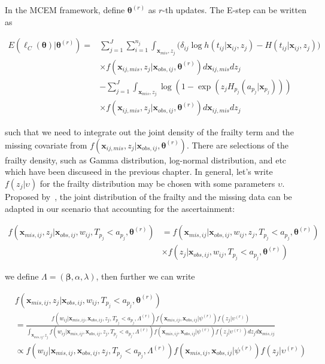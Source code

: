 \documentclass[preprint,12pt]{elsarticle}
\begin{document}
In the MCEM framework, define $\boldsymbol{\theta}^{(r)}$ as $r$-th updates. 
The E-step can be written as 

\begin{align} 
    E(\ell_C(\boldsymbol{\theta})|\boldsymbol{\theta}^{(r)})=&\sum_{j=1}^J\sum_{i=1}^{n_j}\int_{\mathbf{x}_{mis}, z_j}\Big (\delta_{ij}\log h(t_{ij}|\mathbf{x}_{ij}, z_j) - H(t_{ij}|\mathbf{x}_{ij}, z_j)\Big )\\
    &\times f(\mathbf{x}_{ij,mis}, z_j|\mathbf{x}_{obs,ij}, \boldsymbol{\theta}^{(r)})d\mathbf{x}_{ij,mis}dz_j\\
    &-\sum_{j=1}^J \int_{\mathbf{x}_{mis}, z_j} \log(1- \exp(z_j H_{p_j}(a_{p_j}|\mathbf{x}_{p_j})))\\
    &\times f(\mathbf{x}_{ij,mis}, z_j|\mathbf{x}_{obs,ij}, \boldsymbol{\theta}^{(r)})d\mathbf{x}_{ij,mis}dz_j
\end{align}

such that we need to integrate out the joint density of the frailty term and the missing covariate from $f(\mathbf{x}_{ij,mis}, z_j|\mathbf{x}_{obs,ij}, \boldsymbol{\theta}^{(r)})$. 
There are selections of the frailty density, such as Gamma distribution, log-normal distribution, and etc which have been discuseed in the previous chapter.  
In general, let's write $f(z_j|\upsilon)$ for the frailty distribution may be chosen with some parameters $\upsilon$. 
Proposed by~\citet{herring2002frailty}, the joint distribution of the frailty and the missing data can be adapted in our scenario that accounting for the ascertainment:

\begin{align} 
    f(\mathbf{x}_{mis,ij}, z_j|\mathbf{x}_{obs,ij}, w_{ij}, T_{p_j}<a_{p_j}, \boldsymbol{\theta}^{(r)})&=f(\mathbf{x}_{mis,ij}|\mathbf{x}_{obs,ij}, w_{ij}, z_j, T_{p_j}<a_{p_j}, \boldsymbol{\theta}^{(r)})\\
    &\times f(z_j|\mathbf{x}_{obs,ij}, w_{ij}, T_{p_j}<a_{p_j}, \boldsymbol{\theta}^{(r)})
\end{align}

we define $\Lambda = (\boldsymbol{\beta}, \alpha, \lambda)$, then further we can write

\begin{align} 
    &f(\mathbf{x}_{mis,ij}, z_j|\mathbf{x}_{obs,ij}, w_{ij}, T_{p_j}<a_{p_j}, \boldsymbol{\theta}^{(r)})\\
    &=\frac{f(w_{ij}|\mathbf{x}_{mis,ij}, \mathbf{x}_{obs,ij}, z_j, T_{p_j}<a_{p_j}, \Lambda^{(r)})f(\mathbf{x}_{mis,ij}, \mathbf{x}_{obs,ij}|\psi^{(r)})f(z_j|\upsilon^{(r)})}{\int_{\mathbf{x}_{mis,ij},z_j}f(w_{ij}|\mathbf{x}_{mis,ij}, \mathbf{x}_{obs,ij}, z_j, T_{p_j}<a_{p_j}, \Lambda^{(r)})f(\mathbf{x}_{mis,ij}, \mathbf{x}_{obs,ij}|\psi^{(r)})f(z_j|\upsilon^{(r)})dz_jd\mathbf{x}_{mis,ij}}\\
    &\propto f(w_{ij}|\mathbf{x}_{mis,ij}, \mathbf{x}_{obs,ij}, z_j, T_{p_j}<a_{p_j}, \Lambda^{(r)})f(\mathbf{x}_{mis,ij}, \mathbf{x}_{obs,ij}|\psi^{(r)})f(z_j|\upsilon^{(r)})
\end{align}
\end{document}
